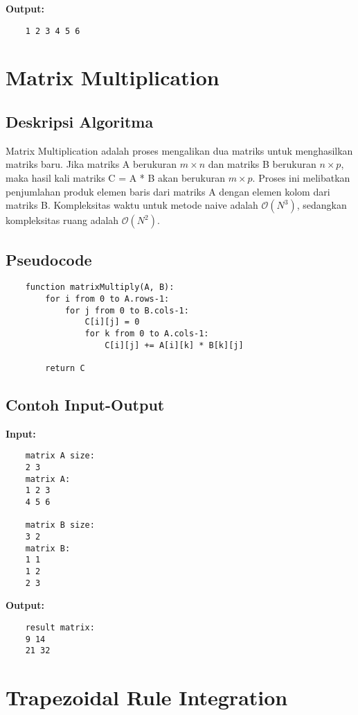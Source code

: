 \textbf{Output:}
\begin{verbatim}
    1 2 3 4 5 6
\end{verbatim}

\section{Matrix Multiplication}
\label{sec:matrix-multiplication-implementation}

\subsection{Deskripsi Algoritma}
Matrix Multiplication adalah proses mengalikan dua matriks untuk menghasilkan matriks baru. Jika matriks A berukuran $m \times n$ dan matriks B berukuran $n \times p$, maka hasil kali matriks C = A * B akan berukuran $m \times p$. Proses ini melibatkan penjumlahan produk elemen baris dari matriks A dengan elemen kolom dari matriks B. Kompleksitas waktu untuk metode naive adalah $\mathcal{O}\left(N^3\right)$, sedangkan kompleksitas ruang adalah $\mathcal{O}\left(N^2\right)$.

\subsection{Pseudocode}
\begin{verbatim}
    function matrixMultiply(A, B):
        for i from 0 to A.rows-1:
            for j from 0 to B.cols-1:
                C[i][j] = 0
                for k from 0 to A.cols-1:
                    C[i][j] += A[i][k] * B[k][j]

        return C
\end{verbatim}

\subsection{Contoh Input-Output}
\textbf{Input:}
\begin{verbatim}
    matrix A size:
    2 3
    matrix A:
    1 2 3
    4 5 6

    matrix B size:
    3 2
    matrix B:
    1 1
    1 2
    2 3
\end{verbatim}

\textbf{Output:}
\begin{verbatim}
    result matrix:
    9 14
    21 32
\end{verbatim}

\section{Trapezoidal Rule Integration}
\label{sec:trapezoidal-rule-integration-implementation}

